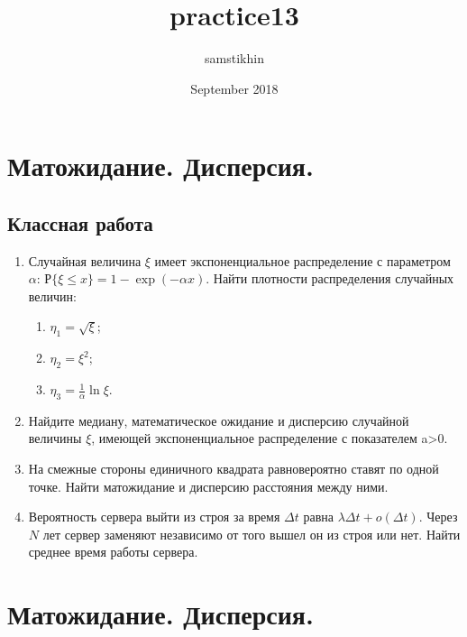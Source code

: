\documentclass[a4paper, 14pt]{extarticle}
\title{practice13}
\author{samstikhin}
\date{September 2018}
\begin{document}
\section*{Матожидание. Дисперсия.}
\subsection*{Классная работа}
\begin{enumerate}
\item Случайная величина $\xi$ имеет экспоненциальное
	распределение с параметром $\alpha$: $Р\{\xi\leq x\} =1- \exp(-\alpha x)$.
	Найти плотности распределения случайных величин:
	\begin{enumerate}
	\item 
	$ \eta_1=\sqrt{\xi}$;
	\item $\eta_2=\xi^2$; 
	\item 	$\eta_3=\frac{1}{\alpha}\ln \xi$.
	\end{enumerate}
\item Найдите медиану, математическое ожидание и дисперсию случайной величины $\xi$, имеющей экспоненциальное распределение с показателем a>0. 
\item На смежные стороны единичного квадрата равновероятно ставят по одной точке. Найти матожидание и дисперсию расстояния между ними.  
\item Вероятность сервера выйти из строя за время $\Delta t$ равна $\lambda\Delta t+o(\Delta t)$. Через $N$ лет сервер заменяют независимо от того вышел он из строя или нет. Найти среднее время работы сервера.   
\end{enumerate}

\newpage

\section*{Матожидание. Дисперсия.}
\end{document}
